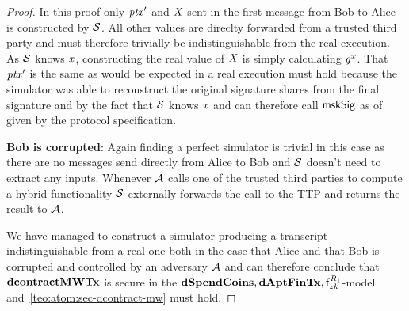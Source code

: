 \begin{proof}
    In this proof only ${\mathit{ptx}}'$ and $\mathit{X}$ sent in the first message from Bob to Alice is constructed by $\mathcal{S}$.
    All other values are direclty forwarded from a trusted third party and must therefore trivially be indistinguishable from the real execution.
    As $\mathcal{S}$ knows $\mathit{x}$, constructing the real value of $\mathit{X}$ is simply calculating $\mathit{g}^{\mathit{x}}$.
    That ${\mathit{ptx}}'$ is the same as would be expected in a real execution must hold because the simulator was able to reconstruct the original signature shares from the final signature and by the fact that $\mathcal{S}$ knows $\mathit{x}$ and can therefore call $\mathsf{mskSig}$ as of given by the protocol specification.

    \textbf{Bob is corrupted}: Again finding a perfect simulator is trivial in this case as there are no messages send directly from Alice to Bob and $\mathcal{S}$ doesn't need to extract any inputs.
    Whenever $\mathcal{A}$ calls one of the trusted third parties to compute a hybrid functionality $\mathcal{S}$ externally forwards the call to the TTP and returns the result to $\mathcal{A}$.

    We have managed to construct a simulator producing a transcript indistinguishable from a real one both in the case that Alice and that Bob is corrupted and controlled by an adversary $\mathcal{A}$ and can therefore conclude that $\mathbf{dcontractMWTx}$ is secure in the $\mathbf{dSpendCoins},\mathbf{dAptFinTx},\mathsf{f}^{\mathit{R}_1}_{zk}$-model and~\cref{teo:atom:sec-dcontract-mw} must hold.
\end{proof}